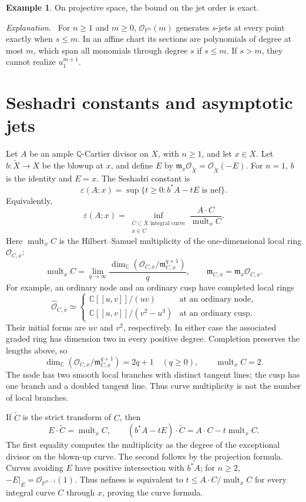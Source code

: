 \documentclass[12pt,a4paper,psamsfonts]{amsart}
\theoremstyle{definition}
\newtheorem{example}[lemma]{Example}
\newenvironment{explanation}{\par\noindent\emph{Explanation.}\ }{\par}
\newcommand{\OO}{\mathcal O}
\newcommand{\C}{\mathbb C}
\begin{document}
\begin{example}
On projective space, the bound on the jet order is exact.
\end{example}
\begin{explanation}
For $n\ge1$ and $m\ge0$, $\OO_{\mathbb P^n}(m)$ generates $s$-jets
at every point exactly when $s\le m$. In an affine chart its sections
are polynomials of degree at most $m$, which span all monomials through
degree $s$ if $s\le m$. If $s>m$, they cannot realize $u_1^{m+1}$.
\end{explanation}

\section{Seshadri constants and asymptotic jets}
Let $A$ be an ample $\mathbb{Q}$-Cartier divisor on $X$, with $n\ge1$,
and let $x\in X$. Let $b:\widetilde X\to X$ be the blowup at $x$,
and define $E$ by
$\mathfrak m_x\OO_{\widetilde X}=\OO_{\widetilde X}(-E)$.
For $n=1$, $b$ is the identity and $E=x$.
The Seshadri constant is
\[
 \varepsilon(A;x)=\sup\{t\ge0:b^*A-tE\text{ is nef}\}.
\]
Equivalently,
\[
 \varepsilon(A;x)
 =\inf_{\substack{C\subset X\text{ integral curve}\\x\in C}}
       \frac{A\cdot C}{\operatorname{mult}_x C}.
\]
Here $\operatorname{mult}_x C$ is the Hilbert--Samuel multiplicity
of the one-dimensional local ring $\OO_{C,x}$:
\[
 \operatorname{mult}_x C
 =\lim_{q\to\infty}
   \frac{\dim_{\C}(\OO_{C,x}/\mathfrak m_{C,x}^{q+1})}{q},
 \qquad \mathfrak m_{C,x}=\mathfrak m_x\OO_{C,x}.
\]
For example, an ordinary node and an ordinary cusp have completed
local rings
\[
 \widehat{\OO}_{C,x}\simeq
 \begin{cases}
  \C[[u,v]]/(uv) & \text{at an ordinary node},\\
  \C[[u,v]]/(v^2-u^3) & \text{at an ordinary cusp}.
 \end{cases}
\]
Their initial forms are $uv$ and $v^2$, respectively. In either
case the associated graded ring has dimension two in every
positive degree. Completion preserves the lengths above, so
\[
 \dim_{\C}(\OO_{C,x}/\mathfrak m_{C,x}^{q+1})=2q+1
 \quad(q\ge0),\qquad \operatorname{mult}_x C=2.
\]
The node has two smooth local branches with distinct tangent lines;
the cusp has one branch and a doubled tangent line. Thus curve
multiplicity is not the number of local branches.

If $\widetilde C$ is the strict transform of $C$, then
\[
 E\cdot\widetilde C=\operatorname{mult}_x C,
 \qquad
 (b^*A-tE)\cdot\widetilde C
 =A\cdot C-t\operatorname{mult}_x C.
\]
The first equality computes the multiplicity as the degree of the
exceptional divisor on the blown-up curve. The second follows by
the projection formula. Curves avoiding $E$ have positive intersection
with $b^*A$; for $n\ge2$, $-E|_E=\OO_{\mathbb P^{n-1}}(1)$.
Thus nefness is equivalent to
$t\le A\cdot C/\operatorname{mult}_x C$ for every integral curve
$C$ through $x$, proving the curve formula.
\end{document}
